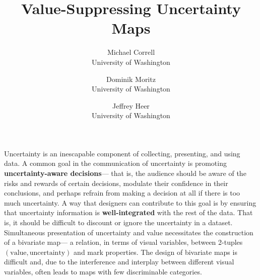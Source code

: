 \documentclass{vgtc}                          %
\title{Value-Suppressing Uncertainty Maps}
\author{Michael Correll\\ %
        \scriptsize University of Washington %
\and Dominik Moritz\\ %
     \scriptsize University of Washington %
\and Jeffrey Heer\\ %
     \scriptsize University of Washington}
\begin{document}


\maketitle




Uncertainty is an inescapable component of collecting, presenting, and using data. A common goal in the communication of uncertainty is promoting \textbf{uncertainty-aware decisions}--- that is, the audience should be aware of the risks and rewards of certain decisions, modulate their confidence in their conclusions, and perhaps refrain from making a decision at all if there is too much uncertainty.  A way that designers can contribute to this goal is by ensuring that uncertainty information is \textbf{well-integrated} with the rest of the data. That is, it should be difficult to discount or ignore the uncertainty in a dataset. Simultaneous presentation of uncertainty and value necessitates the construction of a bivariate map--- a relation, in terms of visual variables, between 2-tuples $(\text{value}, \text{uncertainty})$ and mark properties. The design of bivariate maps is difficult and, due to the interference and interplay between different visual variables, often leads to maps with few discriminable categories. 
\end{document}

